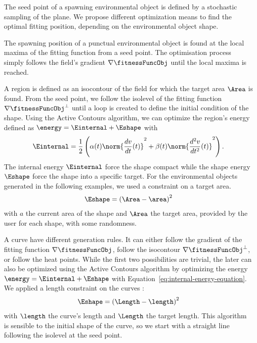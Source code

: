 The seed point of a spawning environmental object is defined by a stochastic sampling of the plane. We propose different optimization means to find the optimal fitting position, depending on the environmental object shape.

The spawning position of a punctual environmental object is found at the local maxima of the fitting function from a seed point. The optimisation process simply follows the field's gradient $\nabla \fitnessFuncObj$ until the local maxima is reached.

A region is defined as an isocontour of the field for which the target area $\Area$ is found. From the seed point, we follow the isolevel of the fitting function $\nabla \fitnessFuncObj^\perp$ until a loop is created to define the initial condition of the shape. Using the Active Contours algorithm, we can optimize the region's energy defined as $\energy = \Einternal + \Eshape$ with  
\begin{align}
    \label{eq:internal-energy-equation}
    \Einternal = \frac{1}{2} \left( \alpha(t) \norm{\frac{d v}{d t}(t)}^2 + \beta(t) \norm{\frac{d^2 v}{d t^2}(t)}^2  \right).
\end{align}
The internal energy $\Einternal$ force the shape compact while the shape energy $\Eshape$ force the shape into a specific target. For the environmental objects generated in the following examples, we used a constraint on a target area.
\begin{align}
    \label{eq:area-target-equation}
    \Eshape = \left( \Area - \area \right)^2
\end{align}
with $a$ the current area of the shape and $\Area$ the target area, provided by the user for each shape, with some randomness.

A curve have different generation rules. It can either follow the gradient of the fitting function $\nabla \fitnessFuncObj$, follow the isocontour $\nabla \fitnessFuncObj^\perp$, or follow the heat points.
While the first two possibilities are trivial, the later can also be optimized using the Active Contours algorithm by optimizing the energy $\energy = \Einternal + \Eshape$ with Equation~\eqref{eq:internal-energy-equation}. We applied a length constraint on the curves : 
\begin{align*}
    \Eshape = \left( \Length - \length \right)^2
\end{align*}
with $\length$ the curve's length and $\Length$ the target length. This algorithm is sensible to the initial shape of the curve, so we start with a straight line following the isolevel at the seed point.

